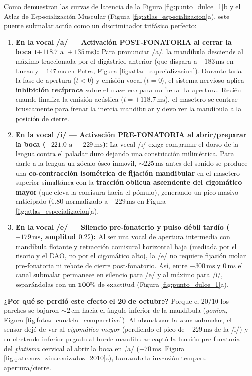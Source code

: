 \documentclass[11pt,a4paper]{article}
\begin{document}
Como demuestran las curvas de latencia de la Figura \ref{fig:punto_dulce_1}b y el Atlas de Especialización Muscular (Figura \ref{fig:atlas_especializacion}a), este puente submalar actúa como un discriminador trifásico perfecto:
\begin{enumerate}
    \item \textbf{En la vocal /a/ --- Activación POST-FONATORIA al cerrar la boca ($+118.7\text{ a }+135\,\text{ms}$):} Para pronunciar /a/, la mandíbula desciende al máximo traccionada por el digástrico anterior (que dispara a $-183\,\text{ms}$ en Lucas y $-147\,\text{ms}$ en Petra, Figura \ref{fig:atlas_especializacion}). Durante toda la fase de apertura ($t < 0$) y emisión vocal ($t = 0$), el sistema nervioso aplica \textbf{inhibición recíproca} sobre el masetero para no frenar la apertura. Recién cuando finaliza la emisión acústica ($t = +118.7\,\text{ms}$), el masetero se contrae bruscamente para frenar la inercia mandibular y devolver la mandíbula a la posición de cierre.
    \item \textbf{En la vocal /i/ --- Activación PRE-FONATORIA al abrir/preparar la boca ($-221.0\text{ a }-229\,\text{ms}$):} La vocal /i/ exige comprimir el dorso de la lengua contra el paladar duro dejando una constricción milimétrica. Para darle a la lengua un zócalo óseo inmóvil, $\sim 225\,\text{ms}$ antes del sonido se produce una \textbf{co-contracción isométrica de fijación mandibular} en el masetero superior simultánea con la \textbf{tracción oblicua ascendente del cigomático mayor} (que eleva la comisura hacia el pómulo), generando un pico masivo anticipado ($0.80$ normalizado a $-229\,\text{ms}$ en Figura \ref{fig:atlas_especializacion}a).
    \item \textbf{En la vocal /e/ --- Silencio pre-fonatorio y pulso débil tardío ($+179\,\text{ms}$, amplitud $0.22$):} Al ser una vocal de apertura intermedia con mandíbula flotante y retracción comisural horizontal baja (mediada por el risorio y el DAO, no por el cigomático alto), la /e/ no requiere fijación molar pre-fonatoria ni rebote de cierre post-fonatorio. Así, entre $-300\,\text{ms}$ y $0\,\text{ms}$ el canal submalar permanece en silencio para /e/ y al máximo para /i/, separándolas con un $\mathbf{100\%}$ de exactitud (Figura \ref{fig:punto_dulce_1}a).
\end{enumerate}

\textbf{¿Por qué se perdió este efecto el 20 de octubre?} Porque el 20/10 los parches se bajaron $\sim 2\,\text{cm}$ hacia el ángulo inferior de la mandíbula (\textit{gonion}, Figura \ref{fig:fotos_candela_comparativa}). Al abandonar la zona submalar, el sensor dejó de ver al \textit{cigomático mayor} (perdiendo el pico de $-229\,\text{ms}$ de la /i/) y su electrodo inferior pegado al borde mandibular captó la tensión pre-fonatoria del \textit{platisma} cervical al abrir la boca en /a/ ($-70\,\text{ms}$, Figura \ref{fig:patrones_sincronizados_2010}a), borrando la inversión temporal apertura/cierre.
\end{document}
